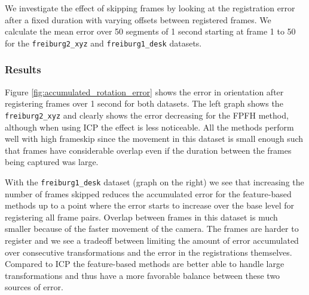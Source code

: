 \documentclass[a4paper]{article}
\begin{document}
We investigate the effect of skipping frames by looking at the registration error after a fixed duration with varying offsets between registered frames. We calculate the mean error over 50 segments of 1 second starting at frame 1 to 50 for the \texttt{freiburg2\_xyz} and \texttt{freiburg1\_desk} datasets.

\subsubsection{Results}

Figure \ref{fig:accumulated_rotation_error} shows the error in orientation after registering frames over 1 second for both datasets. The left graph shows the \texttt{freiburg2\_xyz} and clearly shows the error decreasing for the \ac{FPFH} method, although when using \ac{ICP} the effect is less noticeable. All the methods perform well with high frameskip since the movement in this dataset is small enough such that frames have considerable overlap even if the duration between the frames being captured was large.

With the \texttt{freiburg1\_desk} dataset (graph on the right) we see that increasing the number of frames skipped reduces the accumulated error for the feature-based methods up to a point where the error starts to increase over the base level for registering all frame pairs. Overlap between frames in this dataset is much smaller because of the faster movement of the camera. The frames are harder to register and we see a tradeoff between limiting the amount of error accumulated over consecutive transformations and the error in the registrations themselves. Compared to \ac{ICP} the feature-based methods are better able to handle large transformations and thus have a more favorable balance between these two sources of error.
\end{document}
